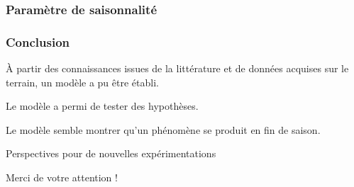 \documentclass[xcolor={dvipsnames}]{beamer}
\begin{document}
\begin{frame}
 \frametitle{Paramètre de saisonnalité}
 
 
 
 
 \begin{figure}
 \end{figure}

 \pause
 \begin{figure}
 \end{figure}

 
\end{frame}


















\begin{frame}
 \frametitle{Conclusion}
 
À partir des connaissances issues de la littérature et de données acquises sur le terrain, un modèle a pu être établi.

\vspace{1cm}

Le modèle a permi de tester des hypothèses.

\vspace{1cm}

Le modèle semble montrer qu'un phénomène se produit en fin de saison.

\vspace{1cm}

Perspectives pour de nouvelles expérimentations

\end{frame}


















\begin{frame}

{\color{bleu} Merci de votre attention !}
\end{frame}
\end{document}
